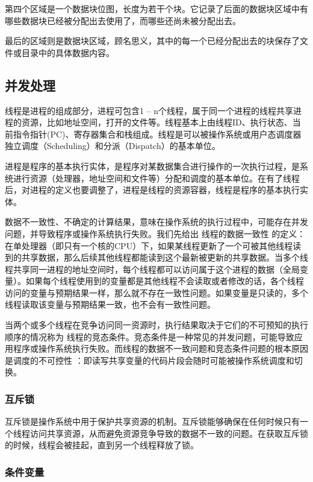 第四个区域是一个数据块位图，长度为若干个块。它记录了后面的数据块区域中有哪些数据块已经被分配出去使用了，而哪些还尚未被分配出去。

最后的区域则是数据块区域，顾名思义，其中的每一个已经分配出去的块保存了文件或目录中的具体数据内容。


\subsection{并发处理}

线程是进程的组成部分，进程可包含1 – n个线程，属于同一个进程的线程共享进程的资源，比如地址空间，打开的文件等。线程基本上由线程ID、执行状态、当前指令指针(PC)、寄存器集合和栈组成。线程是可以被操作系统或用户态调度器独立调度（Scheduling）和分派（Dispatch）的基本单位。

进程是程序的基本执行实体，是程序对某数据集合进行操作的一次执行过程，是系统进行资源（处理器，地址空间和文件等）分配和调度的基本单位。在有了线程后，对进程的定义也要调整了，进程是线程的资源容器，线程是程序的基本执行实体。

数据不一致性、不确定的计算结果，意味在操作系统的执行过程中，可能存在并发问题，并导致程序或操作系统执行失败。我们先给出 线程的数据一致性 的定义：在单处理器（即只有一个核的CPU）下，如果某线程更新了一个可被其他线程读到的共享数据，那么后续其他线程都能读到这个最新被更新的共享数据。当多个线程共享同一进程的地址空间时，每个线程都可以访问属于这个进程的数据（全局变量）。如果每个线程使用到的变量都是其他线程不会读取或者修改的话，各个线程访问的变量与预期结果一样，那么就不存在一致性问题。如果变量是只读的，多个线程读取该变量与预期结果一致，也不会有一致性问题。

当两个或多个线程在竞争访问同一资源时，执行结果取决于它们的不可预知的执行顺序的情况称为 线程的竞态条件。竞态条件是一种常见的并发问题，可能导致应用程序或操作系统执行失败。而线程的数据不一致问题和竞态条件问题的根本原因是调度的不可控性 ：即读写共享变量的代码片段会随时可能被操作系统调度和切换。

\subsubsection{互斥锁}

互斥锁是操作系统中用于保护共享资源的机制。互斥锁能够确保在任何时候只有一个线程访问共享资源，从而避免资源竞争导致的数据不一致的问题。在获取互斥锁的时候，线程会被挂起，直到另一个线程释放了锁。

\subsubsection{条件变量}

